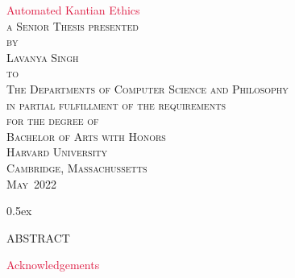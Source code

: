 \documentclass[11pt,a4paper]{article}
\begin{document}

\renewcommand{\maketitle}{
    \pagenumbering{roman}
    \setcounter{page}{1}
	\thispagestyle{empty}
	\vspace*{\fill}
	\vspace{100pt}
	\begin{center}
	\Huge \textcolor{crimson}{Automated Kantian Ethics} \normalsize \\
	\vspace{100pt}
	\textsc{a Senior Thesis presented \\ by\\
	Lavanya Singh\\ to\\ The Departments of Computer Science and Philosophy\\
	\vspace{12pt}
	in partial fulfillment of the requirements\\
	for the degree of\\ Bachelor of Arts with Honors \\
	\vspace{12pt}
	Harvard University\\ Cambridge, Massachussetts\\
	May\ 2022}
	\end{center} \vspace*{\fill}
}
\maketitle
{}

\newpage 
\parskip 0.5ex
\doublespacing

\begin{center}
\textsc{ABSTRACT} \\
\end{center}



\newpage 
\singlespacing
{
  \hypersetup{linkcolor=black}
  \tableofcontents
}

\newpage

{\raggedright \Huge \textcolor{crimson}{\noindent Acknowledgements} \normalsize }
\vspace{3cm}
\bigskip 



\newpage

\doublespacing 
{}

\newpage 

\newpage

\newpage 

\newpage

\newpage

\newpage
\begin{appendices}


\end{appendices}
\end{document}
